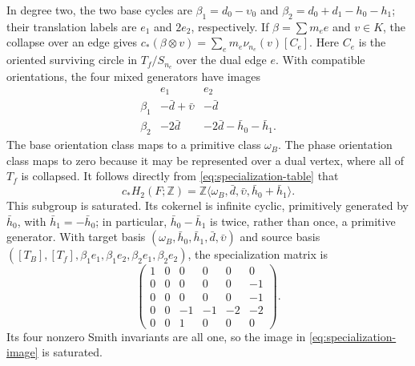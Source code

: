 In degree two, the two
base cycles are $\beta_1=d_0-\upsilon_0$ and
$\beta_2=d_0+d_1-h_0-h_1$; their translation labels are
$e_1$ and $2e_2$, respectively.  If
$\beta=\sum m_e e$ and $v\in K$, the collapse over an edge gives
$c_*(\beta\otimes v)=\sum_e m_e\nu_{n_e}(v)[C_e]$.
Here $C_e$ is the oriented surviving circle in $T_f/S_{n_e}$ over the
dual edge $e$.
With compatible orientations, the four mixed generators have images
\begin{equation}\label{eq:specialization-table}
\begin{array}{c|cc}
 &e_1&e_2\\ \hline
\beta_1&-\bar d+\bar\upsilon&-\bar d\\
\beta_2&-2\bar d&-2\bar d-\bar h_0-\bar h_1.
\end{array}
\end{equation}
The base orientation class maps to a primitive class $\omega_B$.  The phase
orientation class maps to zero because it may be represented over a dual
vertex, where all of $T_f$ is collapsed.  It follows directly from
\eqref{eq:specialization-table} that
\begin{equation}\label{eq:specialization-image}
 c_*H_2(F;\mathbb Z)
 =\mathbb Z\langle\omega_B,\bar d,\bar\upsilon,
                  \bar h_0+\bar h_1\rangle.
\end{equation}
This subgroup is saturated.  Its cokernel is infinite cyclic, primitively
generated by $\bar h_0$, with $\bar h_1=-\bar h_0$; in particular,
$\bar h_0-\bar h_1$ is twice, rather than once, a primitive generator.
With target basis
$(\omega_B,\bar h_0,\bar h_1,\bar d,\bar\upsilon)$ and source basis
$([T_B],[T_f],\beta_1e_1,\beta_1e_2,\beta_2e_1,\beta_2e_2)$, the
specialization matrix is
\begin{equation*}
 \begin{pmatrix}
 1&0& 0& 0& 0& 0\\
 0&0& 0& 0& 0&-1\\
 0&0& 0& 0& 0&-1\\
 0&0&-1&-1&-2&-2\\
 0&0& 1& 0& 0& 0
 \end{pmatrix}.
\end{equation*}
Its four nonzero Smith invariants are all one, so the image in
\eqref{eq:specialization-image} is saturated.

